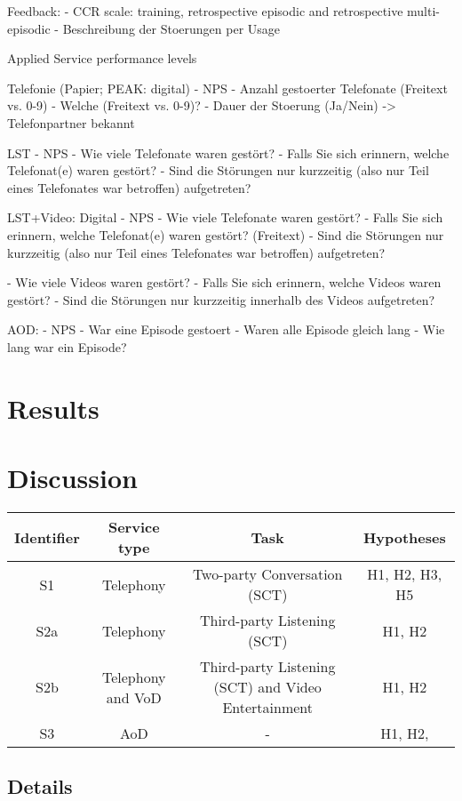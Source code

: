 Feedback:
- CCR scale: training, retrospective episodic and retrospective multi-episodic 
- Beschreibung der Stoerungen per Usage

Applied Service performance levels

Telefonie (Papier; PEAK: digital)
- NPS
- Anzahl gestoerter Telefonate (Freitext vs. 0-9)
- Welche (Freitext vs. 0-9)?
- Dauer der Stoerung (Ja/Nein)
-> Telefonpartner bekannt

LST
- NPS
- Wie viele Telefonate waren gestört?
- Falls Sie sich erinnern, welche Telefonat(e) waren gestört?
- Sind die Störungen nur kurzzeitig (also nur Teil eines Telefonates war betroffen) aufgetreten?

LST+Video: Digital
- NPS
- Wie viele Telefonate waren gestört? 
- Falls Sie sich erinnern, welche Telefonat(e) waren gestört? (Freitext)
- Sind die Störungen nur kurzzeitig (also nur Teil eines Telefonates war betroffen) aufgetreten?

- Wie viele Videos waren gestört?
- Falls Sie sich erinnern, welche Videos waren gestört?
- Sind die Störungen nur kurzzeitig innerhalb des Videos aufgetreten?

AOD:
- NPS
- War eine Episode gestoert
- Waren alle Episode gleich lang
- Wie lang war ein Episode?

\section{Results}
\section{Discussion}
\begin{table}[h]
	\begin{tabular}{|c|c|c|c|}
	Identifier	& Service type 			& Task 									& Hypotheses \\
	\hline
	S1			& Telephony				& Two-party Conversation (\ac{SCT})	& H1, H2, H3, H5 \\
	S2a			& Telephony				& Third-party Listening	(\ac{SCT})		& H1, H2 \\ 
	S2b			& Telephony and \ac{VoD}& Third-party Listening	(\ac{SCT}) and Video Entertainment & H1, H2 \\  %
	S3			& \ac{AoD}				& -										& H1, H2,
	\end{tabular}
\end{table}

\subsection{Details}

